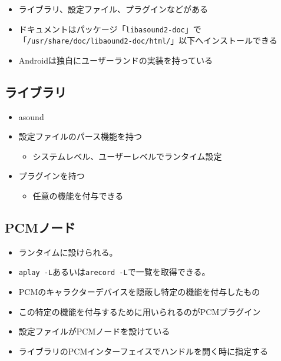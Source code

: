 \documentclass[mingoth,a4paper]{jsarticle}
\begin{document}


\begin{itemize}
\item ライブラリ、設定ファイル、プラグインなどがある
\item ドキュメントはパッケージ「{\tt libasound2-doc}」で「{\tt /usr/share/doc/libaound2-doc/html/}」以下へインストールできる
\item Androidは独自にユーザーランドの実装を持っている
\end{itemize}

\subsection{ライブラリ}
\begin{itemize}
\item  asound
\item 設定ファイルのパース機能を持つ
  \begin{itemize}
  \item  システムレベル、ユーザーレベルでランタイム設定
  \end{itemize}
\item プラグインを持つ
  \begin{itemize}
  \item 任意の機能を付与できる
  \end{itemize}
\end{itemize}

\subsection{PCMノード}
\begin{itemize}
\item ランタイムに設けられる。
\item {\tt aplay -L}あるいは{\tt arecord -L}で一覧を取得できる。
\item PCMのキャラクターデバイスを隠蔽し特定の機能を付与したもの
\item この特定の機能を付与するために用いられるのがPCMプラグイン
\item 設定ファイルがPCMノードを設けている
\item ライブラリのPCMインターフェイスでハンドルを開く時に指定する
\end{itemize}
\end{document}
